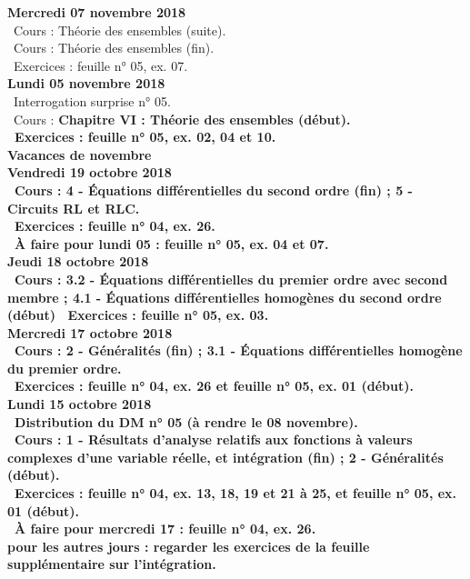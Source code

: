 \documentclass[12pt,a4paper]{article}
\begin{document}
\noindent\textbf{\bf Mercredi 07 novembre 2018}\\
\bu\ Cours : Théorie des ensembles (suite).\\
\bu\ Cours : Théorie des ensembles (fin).\\
\bu\ Exercices : feuille n° 05, ex. 07.\vspace{.4cm}\\

\noindent\textbf{Lundi 05 novembre 2018}\\
\bu\ Interrogation surprise n° 05.\\
\bu\ Cours : \bf Chapitre VI \rm : Théorie des ensembles (début).\\
\bu\ Exercices : feuille n° 05, ex. 02, 04 et 10.\vspace{.4cm}\\

\noindent\textbf{ Vacances de novembre }\vspace{.4cm}\\

\noindent\textbf{Vendredi 19 octobre 2018}\\
\bu\ Cours : 4 - Équations différentielles du second ordre (fin) ; 5 - Circuits RL et RLC.\\
\bu\ Exercices : feuille n° 04, ex. 26.\\
\bu\ À faire pour lundi 05 : feuille n° 05, ex. 04 et 07.\vspace{.4cm}\\

\noindent\textbf{Jeudi 18 octobre 2018}\\
\bu\ Cours : 3.2 - Équations différentielles du premier ordre avec second membre ; 4.1 - Équations 
différentielles homogènes du second ordre (début)
\bu\ Exercices : feuille n° 05, ex. 03.\vspace{.4cm}\\
 
\noindent\textbf{\bf Mercredi 17 octobre 2018}\\
\bu\ Cours : 2 - Généralités (fin) ; 3.1 - Équations différentielles homogène du premier ordre.\\
\bu\ Exercices : feuille n° 04, ex. 26 et feuille n° 05, ex. 01 (début).\vspace{.4cm}\\
 
\noindent\textbf{Lundi 15 octobre 2018}\\
\bu\ Distribution du DM n° 05 (à rendre le 08 novembre).\\
\bu\ Cours : 1 - Résultats d'analyse relatifs aux fonctions à valeurs complexes d'une variable réelle, et intégration 
(fin) ; 2 - Généralités (début).\\
\bu\ Exercices : feuille n° 04, ex. 13, 18, 19 et 21 à 25, et feuille n° 05, ex. 01 (début).\\
\bu\ À faire pour mercredi 17 : feuille n° 04, ex. 26.\\
\bu pour les autres jours : regarder les exercices de la feuille supplémentaire sur l'intégration.\vspace{.4cm}\\
 
\end{document}
